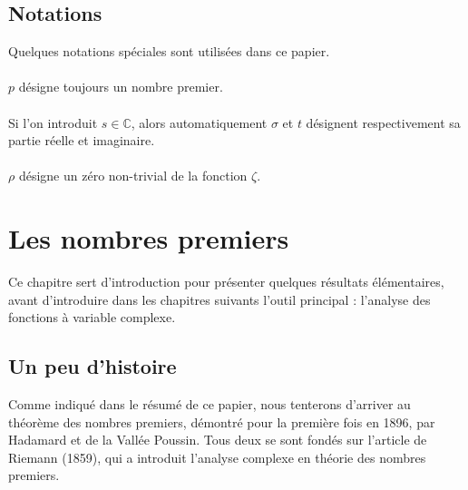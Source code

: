 \documentclass[french]{report}
\begin{document}
\pagebreak
\section*{Notations}
Quelques notations spéciales sont utilisées dans ce papier.
\\\\
$p$ désigne toujours un nombre premier.
\\\\
Si l'on introduit $s\in\mathbb{C}$, alors automatiquement $\sigma$ et $t$ désignent respectivement sa partie réelle et imaginaire.
\\\\
$\rho$ désigne un zéro non-trivial de la fonction $\zeta$.
\chapter{Les nombres premiers}

Ce chapitre sert d'introduction pour présenter quelques résultats élémentaires, avant d'introduire dans les chapitres suivants l'outil principal : l'analyse des fonctions à variable complexe.

\section{Un peu d'histoire}

Comme indiqué dans le résumé de ce papier, nous tenterons d'arriver au théorème des nombres premiers, démontré pour la première fois en 1896, par Hadamard et de la Vallée Poussin. Tous deux se sont fondés sur l'article \cite{riemann} de Riemann (1859), qui a introduit l'analyse complexe en théorie des nombres premiers.
\\
\end{document}
